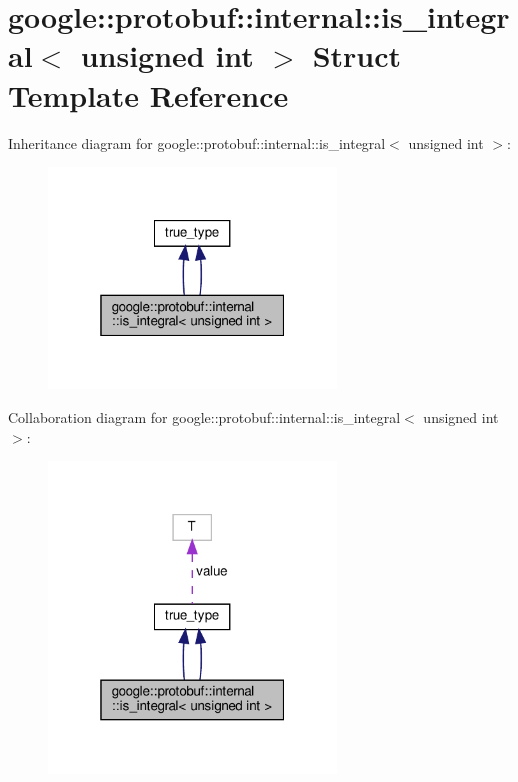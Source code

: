 \hypertarget{structgoogle_1_1protobuf_1_1internal_1_1is__integral_3_01unsigned_01int_01_4}{}\section{google\+:\+:protobuf\+:\+:internal\+:\+:is\+\_\+integral$<$ unsigned int $>$ Struct Template Reference}
\label{structgoogle_1_1protobuf_1_1internal_1_1is__integral_3_01unsigned_01int_01_4}


Inheritance diagram for google\+:\+:protobuf\+:\+:internal\+:\+:is\+\_\+integral$<$ unsigned int $>$\+:
\nopagebreak
\begin{figure}[H]
\begin{center}
\leavevmode
\includegraphics[width=217pt]{structgoogle_1_1protobuf_1_1internal_1_1is__integral_3_01unsigned_01int_01_4__inherit__graph}
\end{center}
\end{figure}


Collaboration diagram for google\+:\+:protobuf\+:\+:internal\+:\+:is\+\_\+integral$<$ unsigned int $>$\+:
\nopagebreak
\begin{figure}[H]
\begin{center}
\leavevmode
\includegraphics[width=217pt]{structgoogle_1_1protobuf_1_1internal_1_1is__integral_3_01unsigned_01int_01_4__coll__graph}
\end{center}
\end{figure}
